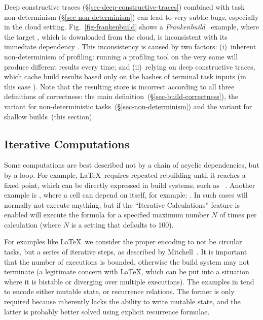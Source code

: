 Deep constructive traces (\S\ref{sec-deep-constructive-traces}) combined with
task non-determinism (\S\ref{sec-non-determinism}) can lead to very subtle bugs,
especially in the cloud setting. Fig.~\ref{fig-frankenbuild} shows a
\emph{Frankenbuild}~\cite{esfahani2016cloudbuild} example, where the target
, which is downloaded from the cloud, is inconsistent with its
immediate dependency . This inconsistency is caused by two factors:
(i)~inherent non-determinism of profiling: running a profiling tool on the very
same  will produce different  results every time;
and (ii)~relying on deep constructive traces, which cache build results based
only on the hashes of terminal task inputs (in this case ). Note
that the resulting store is incorrect according to all three definitions of
correctness: the main definition~(\S\ref{sec-build-correctness}), the variant
for non-deterministic tasks~(\S\ref{sec-non-determinism}) and the variant for
shallow builds~(this section).


\subsection{Iterative Computations}\label{sec-iterative-compute}

Some computations are best described not by a chain of acyclic dependencies,
but by a loop. For example, \LaTeX~requires repeated rebuilding until it
reaches a fixed point, which can be directly expressed in build systems, such as
\Pluto~\cite{erdweg2015pluto}. Another example is \Excel, where a cell can
depend on itself, for example: . In such cases \Excel will
normally not execute anything, but if the ``Iterative Calculations'' feature is
enabled \Excel will execute the formula for a specified maximum number $N$ of
times per calculation (where $N$ is a setting that defaults to 100).

For examples like \LaTeX~we consider the proper encoding to not be circular
tasks, but a series of iterative steps, as described by
Mitchell~. It is important that the number of
executions is bounded, otherwise the build system may not terminate (a
legitimate concern with \LaTeX, which can be put into a situation where it is
bistable or diverging over multiple executions). The examples in \Excel tend to
encode either mutable state, or recurrence relations. The former is only
required because \Excel inherently lacks the ability to write mutable state, and
the latter is probably better solved using explicit recurrence formulae.

